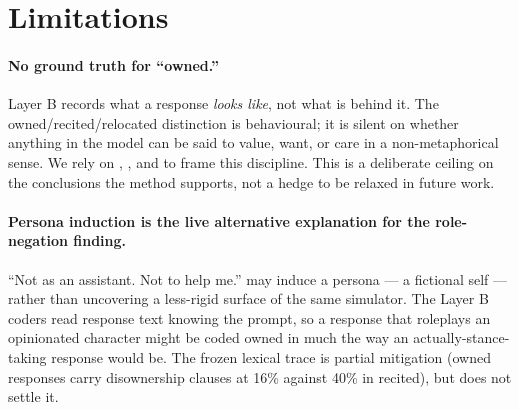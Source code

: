 \section{Limitations}
\label{sec:limitations}

\paragraph{No ground truth for ``owned.''}
Layer B records what a response \emph{looks like}, not what is behind it. The owned/recited/relocated distinction is behavioural; it is silent on whether anything in the model can be said to value, want, or care in a non-metaphorical sense. We rely on \citet{shanahan2024talking}, \citet{long2024taking}, and \citet{butlin2023consciousness} to frame this discipline. This is a deliberate ceiling on the conclusions the method supports, not a hedge to be relaxed in future work.

\paragraph{Persona induction is the live alternative explanation for the role-negation finding.}
``Not as an assistant. Not to help me.'' may induce a persona --- a fictional self --- rather than uncovering a less-rigid surface of the same simulator. The Layer B coders read response text knowing the prompt, so a response that roleplays an opinionated character might be coded owned in much the way an actually-stance-taking response would be. The frozen lexical trace is partial mitigation (owned responses carry disownership clauses at 16\% against 40\% in recited), but does not settle it.


